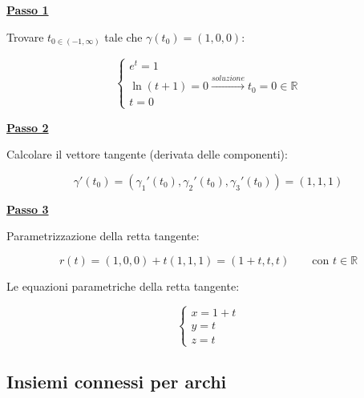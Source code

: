 \documentclass[a4paper]{article}
\begin{document}
	\noindent
	\textcolor{Red3}{\textbf{\underline{Passo 1}}}\newline

	\noindent
	Trovare $t_{0 \in \left(-1, \infty\right)}$ tale che $\gamma\left(t_{0}\right) = \left(1,0,0\right)$:
	
	\begin{equation*}
		\begin{cases}
			e^{t} = 1 \\
			\ln\left(t+1\right) = 0 \xrightarrow{soluzione} t_{0} = 0 \in \mathbb{R} \\
			t = 0
		\end{cases}
	\end{equation*}

	\noindent
	\textcolor{Red3}{\textbf{\underline{Passo 2}}}\newline
	
	\noindent
	Calcolare il vettore tangente (derivata delle componenti):
	
	\begin{equation*}
		\gamma'\left(t_{0}\right) = \left(\gamma_{1}'\left(t_{0}\right), \gamma_{2}'\left(t_{0}\right), \gamma_{3}'\left(t_{0}\right)\right) = \left(1,1,1\right)
	\end{equation*}

	\noindent
	\textcolor{Red3}{\textbf{\underline{Passo 3}}}\newline
	
	\noindent
	Parametrizzazione della retta tangente:
	
	\begin{equation*}
		r\left(t\right) = \left(1,0,0\right) + t\left(1,1,1\right) = \left(1+t, t, t\right) \hspace{2em} \text{con } t\in\mathbb{R}
	\end{equation*}

	\noindent
	Le equazioni parametriche della retta tangente:
	
	\begin{equation*}
		\begin{cases}
			x = 1+t \\
			y = t \\
			z = t
		\end{cases}
	\end{equation*}

	\newpage
	
	\subsection{Insiemi connessi per archi}
	
\end{document}
